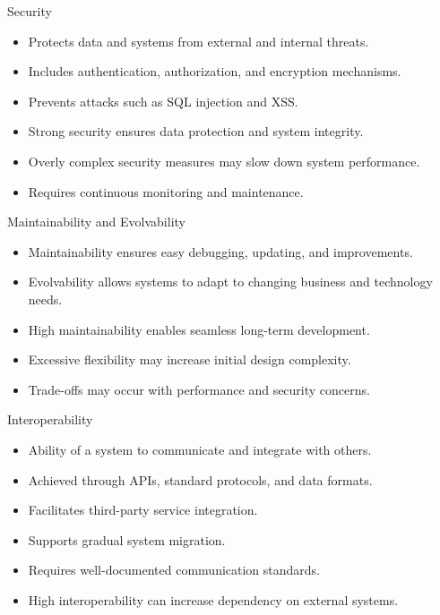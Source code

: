 \documentclass[aspectratio=169, table]{beamer}
\begin{document}
	\begin{frame}{Security}
		\begin{itemize}
			\item Protects data and systems from external and internal threats.
			\item Includes authentication, authorization, and encryption mechanisms.
			\item Prevents attacks such as SQL injection and XSS.
			\item Strong security ensures data protection and system integrity.
			\item Overly complex security measures may slow down system performance.
			\item Requires continuous monitoring and maintenance.
		\end{itemize}
	\end{frame}
	
	\begin{frame}{Maintainability and Evolvability}
		\begin{itemize}
			\item Maintainability ensures easy debugging, updating, and improvements.
			\item Evolvability allows systems to adapt to changing business and technology needs.
			\item High maintainability enables seamless long-term development.
			\item Excessive flexibility may increase initial design complexity.
			\item Trade-offs may occur with performance and security concerns.
		\end{itemize}
	\end{frame}
	
	\begin{frame}{Interoperability}
		\begin{itemize}
			\item Ability of a system to communicate and integrate with others.
			\item Achieved through APIs, standard protocols, and data formats.
			\item Facilitates third-party service integration.
			\item Supports gradual system migration.
			\item Requires well-documented communication standards.
			\item High interoperability can increase dependency on external systems.
		\end{itemize}
	\end{frame}
	
\end{document}

